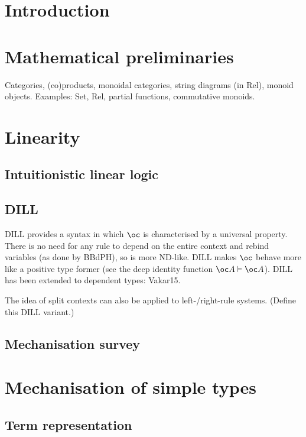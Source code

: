 \documentclass[a4paper,oneside,11pt]{book}
\theoremstyle{definition}
\begin{document}
\chapter{Introduction}

\chapter{Mathematical preliminaries}
  Categories, (co)products, monoidal categories, string diagrams (in Rel),
  monoid objects.
  Examples: Set, Rel, partial functions, commutative monoids.

\chapter{Linearity}
  \section{Intuitionistic linear logic}
  
  \section{DILL}
  DILL provides a syntax in which $\oc$ is characterised by a universal
  property.
  There is no need for any rule to depend on the entire context and rebind
  variables (as done by BBdPH), so is more ND-like.
  DILL makes $\oc$ behave more like a positive type former (see the deep
  identity function $\oc A \vdash \oc A$).
  DILL has been extended to dependent types: Vakar15.

  The idea of split contexts can also be applied to left-/right-rule systems.
  (Define this DILL variant.)

  \section{Mechanisation survey}


\chapter{Mechanisation of simple types}
  \section{Term representation}
  
\end{document}
